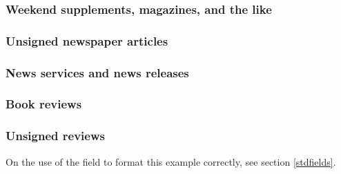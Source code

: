 \documentclass[11pt,letterpaper,oneside]{article}
\begin{document}
\setcounter{subsubsection}{196}
\subsubsection{Weekend supplements, magazines, and the like}

\begin{citebib}
\item \cite[48]{ghansah2015}
\end{citebib}

\setcounter{subsubsection}{198}
\subsubsection{Unsigned newspaper articles}

\begin{citebib}
\item \cite{nytimes2002}
\end{citebib}

\subsubsection{News services and news releases}

\begin{citebib}
\item \cite{ap2015}
\end{citebib}

\setcounter{subsubsection}{201}
\subsubsection{Book reviews}
\label{14.202}

\begin{citebib}
\item \cite[B13--B14]{ratliff1999}
\item \cite{kamp2006}
\item \cite{brehm2015}
\end{citebib}

\setcounter{subsubsection}{203}
\subsubsection{Unsigned reviews}
\label{14.204}

On the use of the  field to format this example
correctly, see section \ref{stdfields}.
\end{document}
